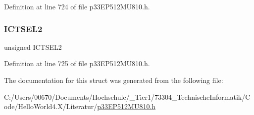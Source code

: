 Definition at line 724 of file p33\+E\+P512\+M\+U810.\+h.

\mbox{\label{structtag_i_c4_c_o_n1_b_i_t_s_a47d80892d449e6edbd5ba2ba9ff06deb}} 
\subsubsection{\texorpdfstring{I\+C\+T\+S\+E\+L2}{ICTSEL2}}
{\footnotesize\ttfamily unsigned I\+C\+T\+S\+E\+L2}



Definition at line 725 of file p33\+E\+P512\+M\+U810.\+h.



The documentation for this struct was generated from the following file\+:\begin{DoxyCompactItemize}
\item 
C\+:/\+Users/00670/\+Documents/\+Hochschule/\+\_\+\+Tier1/73304\+\_\+\+Technische\+Informatik/\+Code/\+Hello\+World4.\+X/\+Literatur/\hyperlink{p33_e_p512_m_u810_8h}{p33\+E\+P512\+M\+U810.\+h}\end{DoxyCompactItemize}
